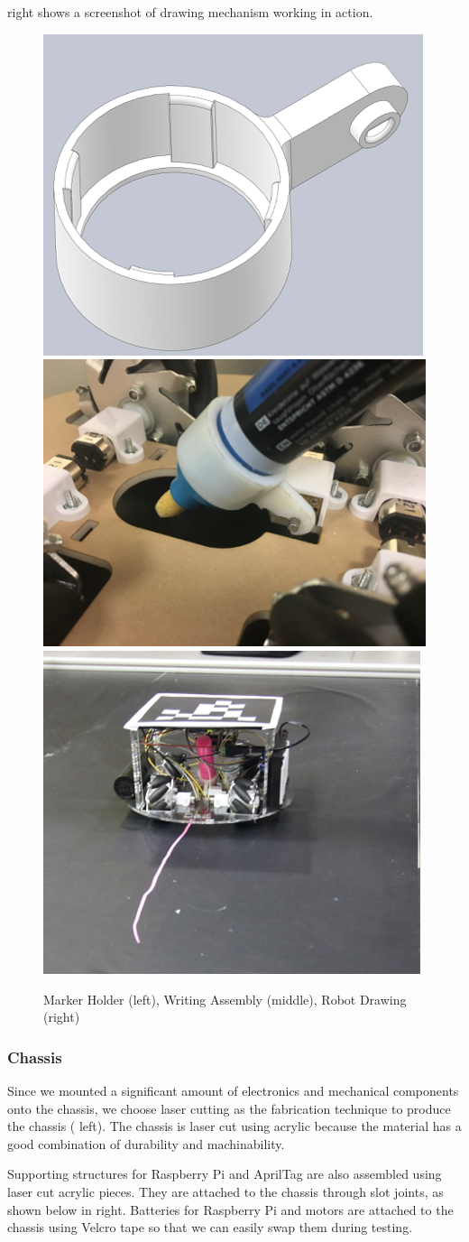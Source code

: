  right shows a screenshot of drawing mechanism working in action.
\begin{figure}[h!]
\centering
\includegraphics[width=0.33\columnwidth]{figs/writing1.png}
\includegraphics[width=0.33\columnwidth]{figs/writing2.png}
\includegraphics[width=0.33\columnwidth]{figs/writing3.png}
\caption{Marker Holder (left), Writing Assembly (middle), Robot Drawing (right)}
\label{fig:so3}
\end{figure}

\subsubsection{Chassis}
\label{sec:me_chassis}
Since we mounted a significant amount of electronics and mechanical components onto the chassis, we choose laser cutting as the fabrication technique to produce the chassis ( left). The chassis is laser cut using acrylic because the material has a good combination of durability and machinability.

Supporting structures for Raspberry Pi and AprilTag are also assembled using laser cut acrylic pieces. They are attached to the chassis through slot joints, as shown below in  right. Batteries for Raspberry Pi and motors are attached to the chassis using Velcro tape so that we can easily swap them during testing.

